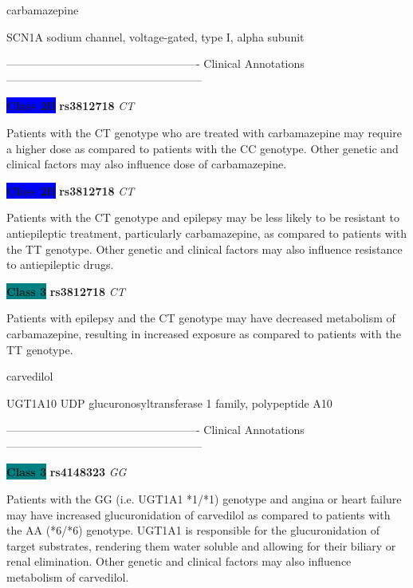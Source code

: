 \documentclass{resume} %
\begin{document}
\begin{rSection}{ carbamazepine }
\begin{rSubsection}{ SCN1A }{ sodium channel, voltage-gated, type I, alpha subunit }{}{}
\item[] ---------------------------------------------------- Clinical Annotations -----------------------------------------------------\newline
\item \textbf{\colorbox{blue} {Class 2B}} \textbf{ rs3812718 } \textit{ CT }
\item[] Patients with the CT genotype who are treated with carbamazepine may require a higher dose as compared to patients with the CC genotype. Other genetic and clinical factors may also influence dose of carbamazepine.\item \textbf{\colorbox{blue} {Class 2B}} \textbf{ rs3812718 } \textit{ CT }
\item[] Patients with the CT genotype and epilepsy may be less likely to be resistant to antiepileptic treatment, particularly carbamazepine, as compared to patients with the TT genotype. Other genetic and clinical factors may also influence resistance to antiepileptic drugs.\item \textbf{\colorbox{teal} {Class 3}} \textbf{ rs3812718 } \textit{ CT }
\item[] Patients with epilepsy and the CT genotype may have decreased metabolism of carbamazepine, resulting in increased exposure as compared to patients with the TT genotype. 
\end{rSubsection}

\end{rSection}\begin{rSection}{ carvedilol }
\item[]

\begin{rSubsection}{ UGT1A10 }{ UDP glucuronosyltransferase 1 family, polypeptide A10 }{}{}
\item[]

\item[] ---------------------------------------------------- Clinical Annotations -----------------------------------------------------\newline
\item \textbf{\colorbox{teal} {Class 3}} \textbf{ rs4148323 } \textit{ GG }
\item[] Patients with the GG (i.e. UGT1A1 *1/*1) genotype and angina or heart failure may have increased glucuronidation of carvedilol as compared to patients with the AA (*6/*6) genotype. UGT1A1 is responsible for the glucuronidation of target substrates, rendering them water soluble and allowing for their biliary or renal elimination. Other genetic and clinical factors may also influence metabolism of carvedilol.
\end{rSubsection}


\end{rSection}
\end{document}
